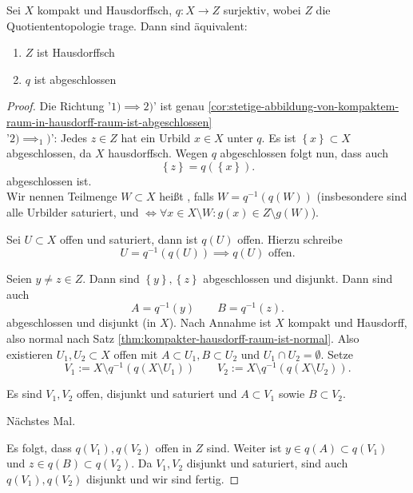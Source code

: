 \begin{theorem}\label{thm:quotientenraum-von-hausdorffraum-ist-hausdorff-gdw-projektion-abgeschlossen}
    Sei $X$ kompakt und Hausdorffsch, $q: X \to  Z$ surjektiv, wobei  $Z$ die Quotiententopologie trage. Dann sind äquivalent: 
    \begin{enumerate}[1)]
        \item $Z$ ist Hausdorffsch
        \item  $q$ ist abgeschlossen
    \end{enumerate}
\end{theorem}
\begin{proof}
    Die Richtung '$1) \implies 2)$' ist genau \autoref{cor:stetige-abbildung-von-kompaktem-raum-in-hausdorff-raum-ist-abgeschlossen} \\
    '$2)\implies_1)$': Jedes $z\in Z$ hat ein Urbild $x\in X$ unter $q$. Es ist  $\left \{x\right\} \subset X$ abgeschlossen, da $X$ hausdorffsch. Wegen  $q$ abgeschlossen folgt nun, dass auch
    \[
        \left \{z\right\}  = q(\left \{x\right\} )
    .\] 
    abgeschlossen ist. \\
    Wir nennen Teilmenge $W\subset X$ heißt , falls $W = q^{-1}(q(W))$ (insbesondere sind alle Urbilder saturiert, und $\iff  \forall x\in X \setminus W : g(x) \in Z \setminus g(W)$). \\
\begin{remark}
    Sei $U\subset X$ offen und saturiert, dann ist $q(U)$ offen. Hierzu schreibe
    \[
        U = q^{-1}(q(U)) \implies q(U) \text{ offen}
    .\] 
\end{remark}
Seien $y\neq z\in Z$. Dann sind $\left \{y\right\} ,\left \{z\right\} $ abgeschlossen und disjunkt. Dann sind auch
\[
    A = q^{-1}(y) \qquad B = q^{-1}(z)
.\] 
abgeschlossen und disjunkt (in  $X$). Nach Annahme ist  $X$ kompakt und Hausdorff, also normal nach Satz \ref{thm:kompakter-hausdorff-raum-ist-normal}. Also existieren  $U_1,U_2\subset X$ offen mit $A\subset U_1,B\subset U_2$ und $U_1 \cap U_2 = \emptyset$. Setze
\[
    V_1 := X \setminus q^{-1}(q(X\setminus U_1)) \qquad V_2 := X \setminus q^{-1}(q(X\setminus U_2))
.\] 
\begin{claim}
    Es sind $V_1,V_2$ offen, disjunkt und saturiert und $A\subset V_1$ sowie $B\subset V_2$.
\end{claim}
\begin{subproof}
    Nächstes Mal.
\end{subproof}
Es folgt, dass $q(V_1),q(V_2)$ offen in $Z$ sind. Weiter ist  $y\in q(A)\subset q(V_1)$ und $z\in q(B) \subset q(V_2)$. Da $V_1,V_2$ disjunkt und saturiert, sind auch $q(V_1),q(V_2)$ disjunkt und wir sind fertig.
\end{proof}
